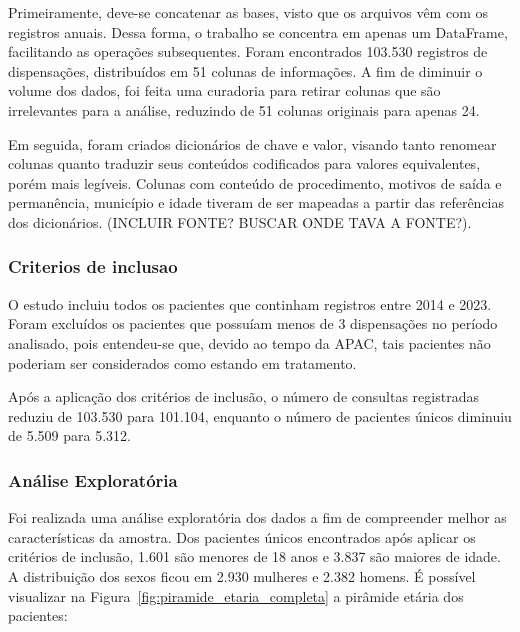 \documentclass[article,a4paper,12pt,brazil,sumario=tradicional]{abntex2}
\begin{document}
Primeiramente, deve-se concatenar as bases, visto que os arquivos vêm com os registros anuais. Dessa forma, o trabalho se concentra em apenas um DataFrame, facilitando as operações subsequentes. Foram encontrados 103.530 registros de dispensações, distribuídos em 51 colunas de informações. A fim de diminuir o volume dos dados, foi feita uma curadoria para retirar colunas que são irrelevantes para a análise, reduzindo de 51 colunas originais para apenas 24.

Em seguida, foram criados dicionários de chave e valor, visando tanto renomear colunas quanto traduzir seus conteúdos codificados para valores equivalentes, porém mais legíveis. Colunas com conteúdo de procedimento, motivos de saída e permanência, município e idade tiveram de ser mapeadas a partir das referências dos dicionários. (INCLUIR FONTE? BUSCAR ONDE TAVA A FONTE?).

\subsubsection{Criterios de inclusao}

O estudo incluiu todos os pacientes que continham registros entre 2014 e 2023. Foram excluídos os pacientes que possuíam menos de 3 dispensações no período analisado, pois entendeu-se que, devido ao tempo da APAC, tais pacientes não poderiam ser considerados como estando em tratamento.

Após a aplicação dos critérios de inclusão, o número de consultas registradas reduziu de 103.530 para 101.104, enquanto o número de pacientes únicos diminuiu de 5.509 para 5.312.

\subsubsection{Análise Exploratória}

Foi realizada uma análise exploratória dos dados a fim de compreender melhor as características da amostra. Dos pacientes únicos encontrados após aplicar os critérios de inclusão, 1.601 são menores de 18 anos e 3.837 são maiores de idade. A distribuição dos sexos ficou em 2.930 mulheres e 2.382 homens. É possível visualizar na Figura~\ref{fig:piramide_etaria_completa} a pirâmide etária dos pacientes:
\end{document}
